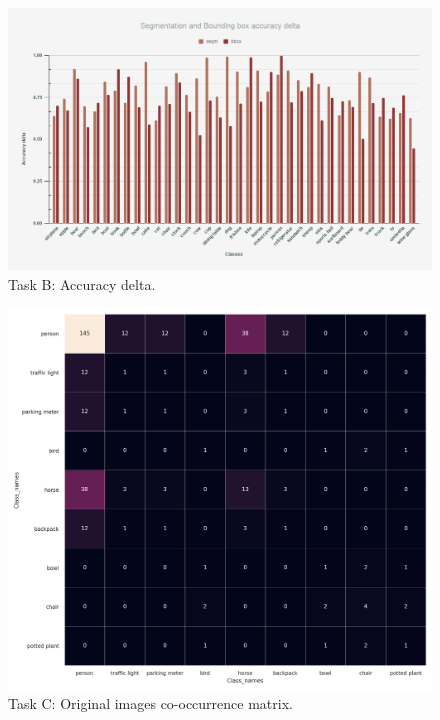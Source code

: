 \documentclass[11pt,a4paper,twocolumn,twoside]{article}
\begin{document}
\begin{figure}[hbt]
    \includegraphics[width=\textwidth,height=\textheight,keepaspectratio]{Resources/Images/task_b_deltas.png}
    \caption{Task B: Accuracy delta.}
    \label{fig:task_b_deltas}
\end{figure}


\begin{figure}[hbt]
    \includegraphics[width=\textwidth,height=\textheight,keepaspectratio]{Resources/Images/task_c_orig_.png}
    \caption{Task C: Original images co-occurrence matrix.}
    \label{fig:task_c_orig}
\end{figure}
\end{document}
